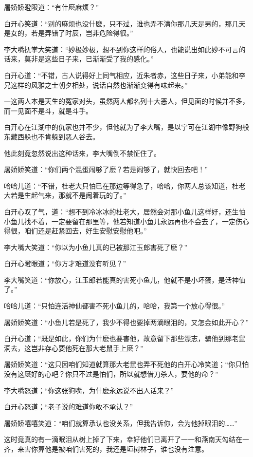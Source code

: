 \documentclass[12pt,oneside]{book}
\begin{document}
屠娇娇瞪限道：``有什麽麻烦？''

白开心笑道：``别的麻烦也没什麽，只不过，谁也弄不清你那几天是男的，那几天是女的，若是弄错了时辰，岂非危险得很。''

李大嘴抚掌大笑道：``妙极妙极，想不到你这样的俗人，也能说出如此妙不可言的话来，莫非是这些日子来，已渐渐受了我的感化。''

白开心道：``不错，古人说得好上同气相应，近朱者赤，这些日子来，小弟能和李兄这样的风雅之士朝夕相处，说话自然也渐渐变得有味起来。''

一这两人本是天生的冤家对头，虽然两人都名列十大恶人，但见面的时候并不多，而一见面不是斗，就是斗手。

白开心在江湖中的仇家也并不少，但他就为了李大嘴，是以宁可在江湖中像野狗般东藏西躲也不肯躲到恶人谷去。

他此刻竟忽然说出这种话来，李大嘴倒不禁怔住了。

屠娇娇笑道：``你们两个混蛋闹够了麽？若是闹够了，就快回去吧！''

哈哈儿道：``不错，杜老大只怕已在那边等得急了，哈哈，你两人总该知道，杜老大若是生起气来，那就不是闹着玩的了。''

白开心叹了气，道：``想不到冷冰冰的杜老大，居然会对那小鱼儿这样好，还生怕小鱼儿找不着，一定要留在那里等，他若知道小鱼儿永远再也不会去了，一定伤心得很，咱们还是赶紧回去，好生安慰安慰他吧。''

李大嘴大笑道：``你以为小鱼儿真的已被那江玉郎害死了麽？''

白开心瞪眼道；``你方才难道没有听见？''

李大嘴笑道：``你放心，江玉郎若能真的害死小鱼儿，他就不是小坏蛋，是活神仙了。''

哈哈儿道：``只怕连活神仙都害不死小鱼儿的，哈哈，我第一个放心得很。''

屠娇娇笑道：``小鱼儿若是死了，我少不得也要掉两滴眼泪的，又怎会如此开心？''

白开心道；``既是如此，你们为什麽也要害他，故意留下那些漂志，骗他到那老鼠洞去，这岂非存心要他死在那大老鼠手上麽？''

屠娇娇笑道：``这只因咱们知道就算那大老鼠也弄不死他的白开心冷笑道；``你只怕没有这麽好的心吧？你只不过是怕们，所以就想借刀杀人，要他的命？''

李大嘴怒道；``你这张狗嘴，为什麽永远说不出人话来？''

白开心怒道；``老子说的难道你敢不承认？''

屠娇娇嘻嘻笑道：``咱们就算承认也没关系，但我告诉你，会为他掉眼泪的\ldots\ldots{}''

这时竟真的有一滴眠泪从树上掉了下来，幸好他们已离开了一一和燕南天勾结在一齐，来害你算他是被咱们害死的，我还是垣树林子，谁也没有注意。
\end{document}
